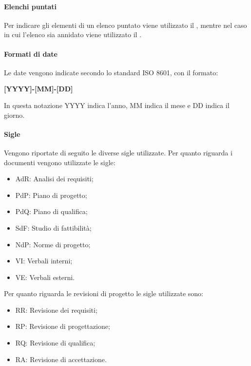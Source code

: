 \paragraph{Elenchi puntati}
\label{par:elenchi}

Per indicare gli elementi di un elenco puntato viene utilizzato il , mentre nel caso in cui l'elenco 
sia annidato viene utilizzato il .

\paragraph{Formati di date}
\label{par:date}

Le date vengono indicate secondo lo standard \textsc{ISO 8601}, con il formato:
\begin{center}
    \textbf{[YYYY]-[MM]-[DD]}
\end{center}
In questa notazione YYYY indica l'anno, MM indica il mese e DD indica il giorno.

\paragraph{Sigle}
\label{par:sigle}

Vengono riportate di seguito le diverse sigle utilizzate.
Per quanto riguarda i documenti vengono utilizzate le sigle:
\begin{itemize}
    \item AdR: Analisi dei requisiti;
    \item PdP: Piano di progetto;
    \item PdQ: Piano di qualifica;
    \item SdF: Studio di fattibilità;
    \item NdP: Norme di progetto;
    \item VI: Verbali interni;
    \item VE: Verbali esterni.
\end{itemize}

Per quanto riguarda le revisioni di progetto le sigle utilizzate sono:
\begin{itemize}
    \item RR: Revisione dei requisiti;
    \item RP: Revisione di progettazione;
    \item RQ: Revisione di qualifica;
    \item RA: Revisione di accettazione.
\end{itemize}

